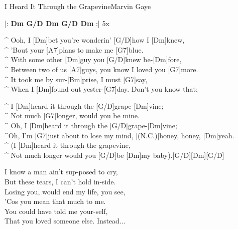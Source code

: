 \begin{song}{I Heard It Through the Grapevine}{Marvin Gaye}

\vspace{-2mm}
\begin{guitar}
|: \textbf{Dm  G/D  Dm  G/D  Dm} :| 5x\\
\end{guitar}


\begin{guitar}
^ Ooh, I [Dm]bet you're wonderin' [G/D]how I [Dm]knew,\\
^ 'Bout your [A7]plans to make me [G7]blue.\\
^ With some other [Dm]guy you [G/D]knew be-[Dm]fore,\\
^ Between two of us [A7]guys, you know I loved you [G7]more.\\
^ It took me by sur-[Bm]prise, I must [G7]say,\\
^ When I [Dm]found out yester-[G7]day. Don't you know that;\\
\end{guitar}


\begin{guitar}
^ I [Dm]heard it through the [G/D]grape-[Dm]vine;\\
^ Not much [G7]longer, would you be mine.\\
^ Oh, I [Dm]heard it through the [G/D]grape-[Dm]vine;\\
^Oh, I'm [G7]just about to lose my mind, [(N.C.)]honey, honey, [Dm]yeah.\\
^ (I [Dm]heard it through the grapevine,\\
^ Not much longer would you [G/D]be  [Dm]my baby).[G/D][Dm][G/D]\\
\end{guitar}


\begin{guitar}
I know a man ain't sup-posed to cry,\\
But these tears, I can't hold in-side.\\
Losing you, would end my life, you see,\\
'Cos you mean that much to me.\\
You could have told me your-self,\\
That you loved someone else. Instead...\\
\end{guitar}




\end{song}
